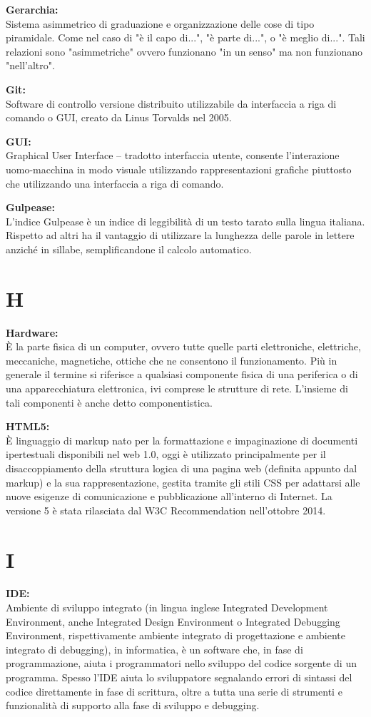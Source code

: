\documentclass[a4paper, oneside, openany, dvipsnames, table]{article}
\begin{document}
\textbf{Gerarchia:}\\ Sistema asimmetrico di graduazione e organizzazione delle cose di tipo piramidale.  
Come nel caso di "è il capo di...", "è parte di...", o "è meglio di...". Tali relazioni sono "asimmetriche" ovvero funzionano "in un senso" ma non funzionano "nell'altro".

\textbf{Git:}\\	 Software di controllo versione distribuito utilizzabile da interfaccia a riga di comando o GUI, creato da Linus Torvalds nel 2005.

\textbf{GUI:}\\ Graphical User Interface -- tradotto interfaccia utente, consente l'interazione uomo-macchina in modo visuale utilizzando rappresentazioni grafiche piuttosto che utilizzando una interfaccia a riga di comando.

\textbf{Gulpease:} \\  L'indice Gulpease è un indice di leggibilità di un testo tarato sulla lingua italiana. Rispetto ad altri ha il vantaggio di utilizzare la lunghezza delle parole in lettere anziché in sillabe, semplificandone il calcolo automatico.

\newpage
\section{H}
\textbf{Hardware:}\\	\`E la parte fisica di un computer, ovvero tutte quelle parti elettroniche, elettriche, meccaniche, magnetiche, ottiche che ne consentono il funzionamento. Più in generale il termine si riferisce a qualsiasi componente fisica di una periferica o di una apparecchiatura elettronica, ivi comprese le strutture di rete. L'insieme di tali componenti è anche detto componentistica.

\textbf{HTML5:}\\	\`E linguaggio di markup nato per la formattazione e impaginazione di documenti ipertestuali disponibili nel web 1.0, oggi è utilizzato principalmente per il disaccoppiamento della struttura logica di una pagina web (definita appunto dal markup)
 e la sua rappresentazione, gestita tramite gli stili CSS per adattarsi alle nuove esigenze di comunicazione e pubblicazione all'interno di Internet. La versione 5 è stata rilasciata dal W3C Recommendation nell'ottobre 2014.

\newpage
\section{I}
\textbf{IDE:}\\	Ambiente di sviluppo integrato (in lingua inglese Integrated Development Environment, anche Integrated Design Environment o Integrated Debugging Environment, rispettivamente ambiente integrato di progettazione e ambiente integrato di debugging), in informatica, è un software che, in fase di programmazione, aiuta i programmatori nello sviluppo del codice sorgente di un programma. Spesso l'IDE aiuta lo sviluppatore segnalando errori di sintassi del codice direttamente in fase di scrittura, oltre a tutta una serie di strumenti e funzionalità di supporto alla fase di sviluppo e debugging.
\end{document}

